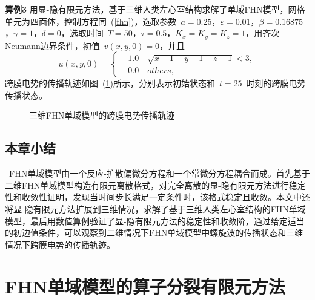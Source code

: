 \documentclass[twoside,UTF8]{nputhesis}
\begin{document}
\textbf{算例3} 用显-隐有限元方法，基于三维人类左心室结构求解了单域FHN模型，网格单元为四面体，控制方程同~(\ref{fhn})，选取参数~$a=0.25$，$\varepsilon=0.01$，$\beta=0.16875$，$\gamma=1$，$\delta=0$，选取时间~$T=50$，$\tau=0.5$，$K_x=K_y=K_z=1$，用齐次Neumann边界条件，初值~$v(x,y,0)=0$，并且
\begin{equation*}
u(x,y,0) =\left\{\begin{aligned}&1.0 \quad\sqrt{x-1+y-1+z-1}<3,\\
&0.0 \quad others,\end{aligned}\right.
\end{equation*}
跨膜电势的传播轨迹如图~(\ref{fig5})所示，分别表示初始状态和~$t=25$~时刻的跨膜电势传播状态。
\begin{figure}[htb]
	\centering
	{	
		}
	\hspace{0.2\textwidth}
	\caption{三维FHN单域模型的跨膜电势传播轨迹}
	\label{fig5}
\end{figure}

\section{本章小结}
~FHN单域模型由一个反应-扩散偏微分方程和一个常微分方程耦合而成。首先基于二维FHN单域模型构造有限元离散格式，对完全离散的显-隐有限元方法进行稳定性和收敛性证明，发现当时间步长满足一定条件时，该格式稳定且收敛。本文中还将显-隐有限元方法扩展到三维情况，求解了基于三维人类左心室结构的FHN单域模型，最后用数值算例验证了显-隐有限元方法的稳定性和收敛阶，通过给定适当的初边值条件，可以观察到二维情况下FHN单域模型中螺旋波的传播状态和三维情况下跨膜电势的传播轨迹。

\chapter{FHN单域模型的算子分裂有限元方法}
\end{document}
